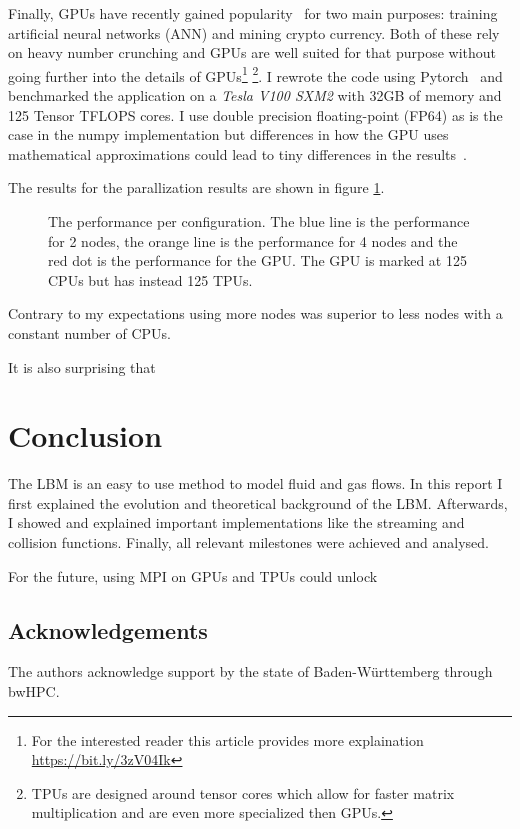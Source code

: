 \documentclass[a4paper,11pt, oneside]{book}
\begin{document}
Finally, GPUs have recently gained popularity~\cite{boyer2013gpu-pop} for two main purposes: training artificial neural networks (ANN) and mining crypto currency. 
Both of these rely on heavy number crunching and GPUs are well suited for that purpose without going further into the details of GPUs\footnote{For the interested reader this article provides more explaination \url{https://bit.ly/3zV04Ik}}
\footnote{TPUs are designed around tensor cores which allow for faster matrix multiplication and are even more specialized then GPUs.}.
I rewrote the code using Pytorch~\cite{pytorch} and benchmarked the application on a \textit{Tesla V100 SXM2} with 32GB of memory and 125 Tensor TFLOPS cores.
I use double precision floating-point (FP64) as is the case in the numpy implementation but differences in how the GPU uses mathematical approximations could lead to tiny differences in the results~\cite{precision-nvidia}.

The results for the parallization results are shown in figure \ref{fig:m7}.
\begin{figure}[ht]
\centering
\resizebox{\columnwidth}{!}{\large}
\caption[Performance per configuration.]{The performance per configuration. The blue line is the performance for 2 nodes, the orange line is the performance for 4 nodes and the red dot is the performance for the GPU. The GPU is marked at 125 CPUs but has instead 125 TPUs.}
\label{fig:m7}
\end{figure}
Contrary to my expectations using more nodes was superior to less nodes with a constant number of CPUs. 

It is also surprising that

\chapter{Conclusion}
The LBM is an easy to use method to model fluid and gas flows. In this report I first explained the evolution and theoretical background of the LBM. 
Afterwards, I showed and explained important implementations like the streaming and collision functions.
Finally, all relevant milestones were achieved and analysed.

For the future, using MPI on GPUs and TPUs could unlock 







\section{Acknowledgements}
The authors acknowledge support by the state of Baden-Württemberg through bwHPC.



\end{document}
